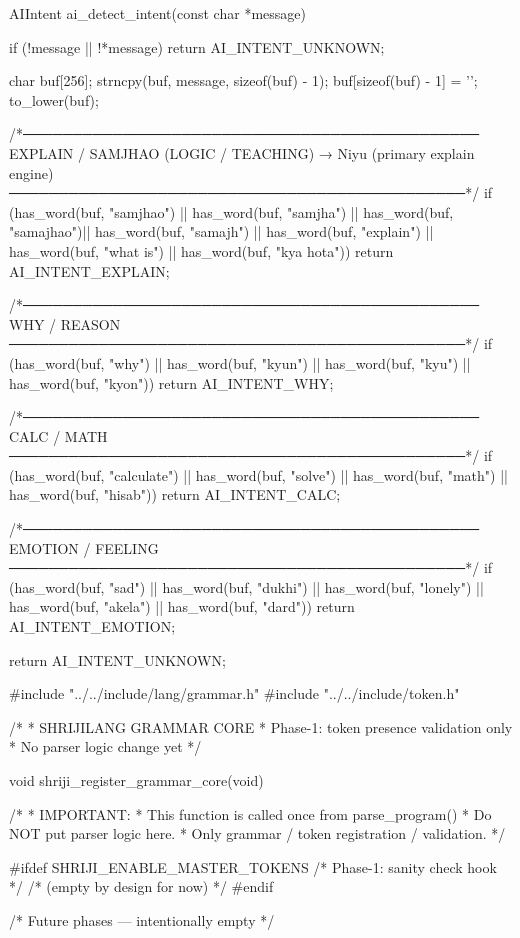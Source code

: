 \documentclass{article}
\begin{document}
AIIntent ai_detect_intent(const char *message)
{
    if (!message || !*message)
        return AI_INTENT_UNKNOWN;

    char buf[256];
    strncpy(buf, message, sizeof(buf) - 1);
    buf[sizeof(buf) - 1] = '\0';
    to_lower(buf);

    /*──────────────────────────────────────────────
      EXPLAIN / SAMJHAO (LOGIC / TEACHING)
      → Niyu (primary explain engine)
    ──────────────────────────────────────────────*/
    if (has_word(buf, "samjhao") ||
        has_word(buf, "samjha")  ||
        has_word(buf, "samajhao")||
        has_word(buf, "samajh")  ||
        has_word(buf, "explain") ||
        has_word(buf, "what is") ||
        has_word(buf, "kya hota"))
        return AI_INTENT_EXPLAIN;

    /*──────────────────────────────────────────────
      WHY / REASON
    ──────────────────────────────────────────────*/
    if (has_word(buf, "why")  ||
        has_word(buf, "kyun") ||
        has_word(buf, "kyu")  ||
        has_word(buf, "kyon"))
        return AI_INTENT_WHY;

    /*──────────────────────────────────────────────
      CALC / MATH
    ──────────────────────────────────────────────*/
    if (has_word(buf, "calculate") ||
        has_word(buf, "solve")     ||
        has_word(buf, "math")      ||
        has_word(buf, "hisab"))
        return AI_INTENT_CALC;

    /*──────────────────────────────────────────────
      EMOTION / FEELING
    ──────────────────────────────────────────────*/
    if (has_word(buf, "sad")    ||
        has_word(buf, "dukhi")  ||
        has_word(buf, "lonely") ||
        has_word(buf, "akela")  ||
        has_word(buf, "dard"))
        return AI_INTENT_EMOTION;

    return AI_INTENT_UNKNOWN;
}
#include "../../include/lang/grammar.h"
#include "../../include/token.h"

/*
 * SHRIJILANG GRAMMAR CORE
 * Phase-1: token presence validation only
 * No parser logic change yet
 */

void shriji_register_grammar_core(void)
{
    /*
     * IMPORTANT:
     * This function is called once from parse_program()
     * Do NOT put parser logic here.
     * Only grammar / token registration / validation.
     */

#ifdef SHRIJI_ENABLE_MASTER_TOKENS
    /* Phase-1: sanity check hook */
    /* (empty by design for now) */
#endif
}

/* Future phases — intentionally empty */
\end{document}
